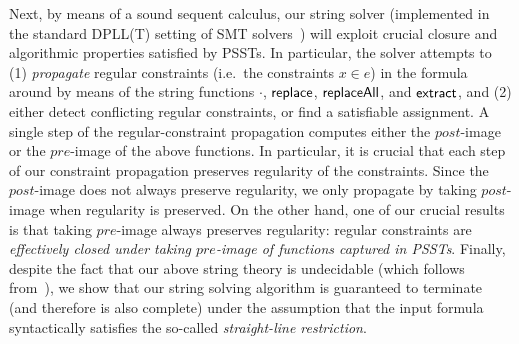 Next, by means of a sound sequent calculus, our string solver (implemented in
the standard DPLL(T) setting of SMT solvers~\cite{NieuwenhuisetalJACM2006})
will exploit crucial closure and algorithmic properties satisfied by PSSTs.
In particular, the solver attempts to
(1) \emph{propagate} regular constraints (i.e.\ the constraints $x \in e$) in the formula around by means of
the string functions $\cdot$, $\mathsf{replace}$, $\mathsf{replaceAll}$, and $\mathsf{extract}$, and
(2) either detect conflicting regular constraints, or find a satisfiable assignment.
A single step of the regular-constraint propagation computes either the
$post$-image or the $pre$-image of the above functions. In particular,
it is crucial that each step of our constraint propagation preserves
regularity of the constraints.
Since the $post$-image does not always preserve regularity,
we only propagate by taking $post$-image when regularity is preserved.
On the other hand, one of our crucial results is that taking $pre$-image
always preserves regularity:
regular constraints are \emph{effectively closed under
taking $pre$-image of functions captured in PSSTs}.
Finally, despite the fact that our above string theory is undecidable
(which follows from~\cite{LB16}), we show that our string solving algorithm is
guaranteed to terminate (and therefore is also complete) under the assumption
that the input formula syntactically satisfies the so-called
\emph{straight-line restriction}.

